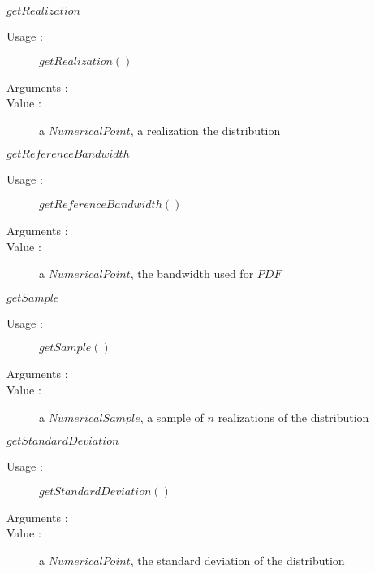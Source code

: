 \begin{description}
\begin{description}
\begin{description}
  \item $getRealization$
    \begin{description}
    \item[Usage :]  $getRealization()$
    \item[Arguments :]  \strut
    \item[Value :] a $NumericalPoint$, a realization the distribution
    \end{description}

  \item $getReferenceBandwidth$
    \begin{description}
    \item[Usage :]  $getReferenceBandwidth()$
    \item[Arguments :]  \strut
    \item[Value :] a $NumericalPoint$, the bandwidth used for $PDF$
    \end{description}

  \item $getSample$
    \begin{description}
    \item[Usage :]  $getSample()$
    \item[Arguments :]  \strut
    \item[Value :] a $NumericalSample$, a sample of $n$ realizations of the distribution
    \end{description}

  \item $getStandardDeviation$
    \begin{description}
    \item[Usage :]  $getStandardDeviation()$
    \item[Arguments :]  \strut
    \item[Value :] a $NumericalPoint$, the standard deviation of the distribution
    \end{description}


\end{description}
\end{description}
\end{description}
